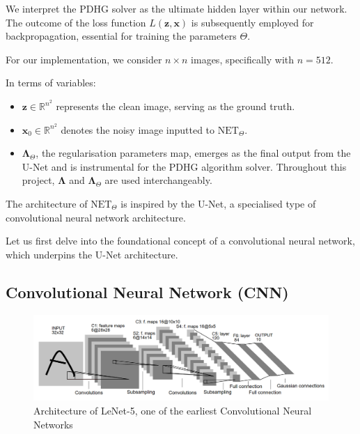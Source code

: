 \documentclass[12pt]{article}
\begin{document}
We interpret the PDHG solver as the ultimate hidden layer within our network. The outcome of the loss function $L(\mathbf{z}, \mathbf{x})$ is subsequently employed for backpropagation, essential for training the parameters $\Theta$.

For our implementation, we consider $n \times n$ images, specifically with $n = 512$.

In terms of variables:
\begin{itemize}
    \item $\mathbf{z} \in \mathbb{R}^{n^2}$ represents the clean image, serving as the ground truth.
    \item $\mathbf{x}_0 \in \mathbb{R}^{n^2}$ denotes the noisy image inputted to $\text{NET}_{\Theta}$.
    \item $\mathbf{\Lambda}_{\Theta}$, the regularisation parameters map, emerges as the final output from the U-Net and is instrumental for the PDHG algorithm solver. Throughout this project, $\mathbf{\Lambda}$ and $\mathbf{\Lambda}_{\Theta}$ are used interchangeably.
\end{itemize}

The architecture of $\text{NET}_{\Theta}$ is inspired by the U-Net, a specialised type of convolutional neural network architecture.

Let us first delve into the foundational concept of a convolutional neural network, which underpins the U-Net architecture.



\subsection{
Convolutional Neural Network (CNN) 
}

\begin{figure}[h]
    \includegraphics[width=1\linewidth]{Le-Net 5.png}
    
    \caption{Architecture of LeNet-5, one of the earliest Convolutional Neural Networks \cite{726791}} 
    \label{fig:enter-label}
\end{figure}
\end{document}
